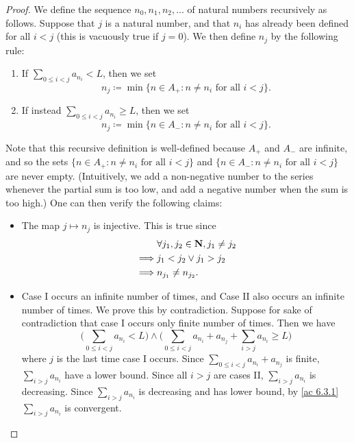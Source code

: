 \begin{proof}
  We define the sequence \(n_0, n_1, n_2, \dots\) of natural numbers recursively as follows.
  Suppose that \(j\) is a natural number, and that \(n_i\) has already been defined for all \(i < j\) (this is vacuously true if \(j = 0\)).
  We then define \(n_j\) by the following rule:
  \begin{enumerate}[label=(\Roman*)]
    \item If \(\sum_{0 \leq i < j} a_{n_i} < L\), then we set
          \[
            n_j \coloneqq \min\{n \in A_+ : n \neq n_i \text{ for all } i < j\}.
          \]
    \item If instead \(\sum_{0 \leq i < j} a_{n_i} \geq L\), then we set
          \[
            n_j \coloneqq \min\{n \in A_- : n \neq n_i \text{ for all } i < j\}.
          \]
  \end{enumerate}
  Note that this recursive definition is well-defined because \(A_+\) and \(A_-\) are infinite, and so the sets \(\{n \in A_+ : n \neq n_i \text{ for all } i < j\}\) and \(\{n \in A_- : n \neq n_i \text{ for all } i < j\}\) are never empty.
  (Intuitively, we add a non-negative number to the series whenever the partial sum is too low, and add a negative number when the sum is too high.)
  One can then verify the following claims:
  \begin{itemize}
    \item The map \(j \mapsto n_j\) is injective.
          This is true since
          \begin{align*}
                     & \forall j_1, j_2 \in \mathbf{N}, j_1 \neq j_2 \\
            \implies & j_1 < j_2 \lor j_1 > j_2              \\
            \implies & n_{j_1} \neq n_{j_2}.
          \end{align*}
    \item Case I occurs an infinite number of times, and Case II also occurs an infinite number of times.
          We prove this by contradiction.
          Suppose for sake of contradiction that case I occurs only finite number of times.
          Then we have
          \[
            \Bigg(\sum_{0 \leq i < j} a_{n_i} < L\Bigg) \land \Bigg(\sum_{0 \leq i < j} a_{n_i} + a_{n_j} + \sum_{i > j} a_{n_i} \geq L\Bigg)
          \]
          where \(j\) is the last time case I occurs.
          Since \(\sum_{0 \leq i < j} a_{n_i} + a_{n_j}\) is finite, \(\sum_{i > j} a_{n_i}\) have a lower bound.
          Since all \(i > j\) are cases II, \(\sum_{i > j} a_{n_i}\) is decreasing.
          Since \(\sum_{i > j} a_{n_i}\) is decreasing and has lower bound, by \cref{ac 6.3.1} \(\sum_{i > j} a_{n_i}\) is convergent.

\end{itemize}
\end{proof}
